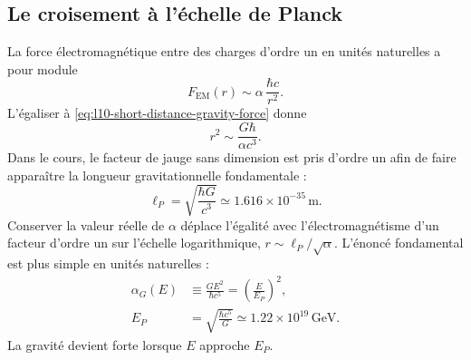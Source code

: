 \begin{classroomqa}
\end{classroomqa}

\begin{classroomqa}
\end{classroomqa}

\subsection{Le croisement à l’échelle de Planck}

La force électromagnétique entre des charges d’ordre un en unités naturelles a pour module
\begin{equation}
  F_{\mathrm{EM}}(r)
  \sim
  \alpha\,\frac{\hbar c}{r^2}.
  \label{eq:l10-em-force-alpha}
\end{equation}
L’égaliser à \eqref{eq:l10-short-distance-gravity-force} donne
\begin{equation}
  r^2\sim\frac{G\hbar}{\alpha c^3}.
  \label{eq:l10-gravity-em-crossing}
\end{equation}
Dans le cours, le facteur de jauge sans dimension est pris d’ordre un afin de faire apparaître la longueur gravitationnelle fondamentale :
\begin{equation}
  \boxed{\ell_P=\sqrt{\frac{\hbar G}{c^3}}}
  \simeq1.616\times10^{-35}\,\mathrm{m}.
  \label{eq:l10-planck-length}
\end{equation}
Conserver la valeur réelle de \(\alpha\) déplace l’égalité avec l’électromagnétisme d’un facteur d’ordre un sur l’échelle logarithmique, \(r\sim\ell_P/\sqrt\alpha\). L’énoncé fondamental est plus simple en unités naturelles :
\begin{equation}
\begin{aligned}
  \alpha_G(E)
  &\equiv\frac{GE^2}{\hbar c^5}
  =\left(\frac{E}{E_P}\right)^2,
  \\
  E_P
  &=\sqrt{\frac{\hbar c^5}{G}}
  \simeq1.22\times10^{19}\,\mathrm{GeV}.
\end{aligned}
  \label{eq:l10-gravitational-coupling}
\end{equation}
La gravité devient forte lorsque \(E\) approche \(E_P\).

